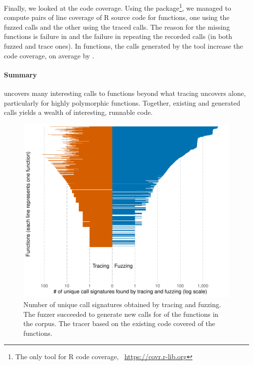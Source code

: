 \documentclass[sigplan,anonymous,review]{acmart}
\begin{document}
Finally, we looked at the code coverage.
Using the  package\footnote{The only tool for R code coverage, \Cf~\url{https://covr.r-lib.org}}, we managed to compute pairs of line coverage of R source code for \UFNumFunctionsWithBothCoverage functions, one using the fuzzed calls and the other using the traced calls.
The reason for the missing functions is failure in  and the failure in repeating the recorded calls (in both fuzzed and trace ones).
In \UFBetterCoverage functions, the calls generated by the  tool increase the code coverage, on average by \UFBetterCoverageMean.

\paragraph{Summary}

\tool uncovers many interesting calls to functions beyond what tracing uncovers alone, particularly for highly polymorphic functions.
Together, existing and generated calls yields a wealth of interesting, runnable code.


\begin{figure}
    \centering
    \includegraphics[width=\columnwidth]{code-and-figures/uf-call-signatures.pdf}
    \caption{Number of unique call signatures obtained by tracing and fuzzing. The fuzzer succeeded to generate new calls for \UFNumFunctionsSignatrToCorpusSignatureRatio of the functions in the corpus. The tracer based on the existing code covered \UFNumFunctionsBaselineToCorpusSignatureRatio of the functions.}
    \label{fig:call-signatures}
\end{figure}
\end{document}
